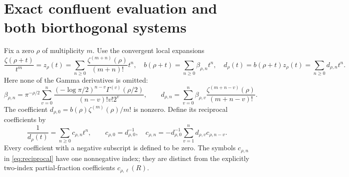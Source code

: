 \documentclass[11pt]{article}
\begin{document}
\section{Exact confluent evaluation and both biorthogonal systems}

Fix a zero $\rho$ of multiplicity $m$. Use the convergent local
expansions
\begin{equation}\label{eq:local}
 \frac{\zeta(\rho+t)}{t^m}=z_\rho(t)
  =\sum_{n\geq0}\frac{\zeta^{(m+n)}(\rho)}{(m+n)!}t^n,
 \quad b(\rho+t)=\sum_{n\geq0}\beta_{\rho,n}t^n,
 \quad d_\rho(t)=b(\rho+t)z_\rho(t)=\sum_{n\geq0}d_{\rho,n}t^n.
\end{equation}
Here none of the Gamma derivatives is omitted:
\begin{equation}\label{eq:gamma-coeff}
 \beta_{\rho,n}=\pi^{-\rho/2}
 \sum_{v=0}^n
 \frac{(-\log\pi/2)^{n-v}\Gamma^{(v)}(\rho/2)}
                   {(n-v)!v!2^v},\qquad
 d_{\rho,n}=\sum_{v=0}^n\beta_{\rho,v}
                  \frac{\zeta^{(m+n-v)}(\rho)}{(m+n-v)!}.
\end{equation}
The coefficient $d_{\rho,0}=b(\rho)\zeta^{(m)}(\rho)/m!$
is nonzero. Define its reciprocal coefficients by
\begin{equation}\label{eq:reciprocal}
 \frac1{d_\rho(t)}=\sum_{n\geq0}c_{\rho,n}t^n,\qquad
 c_{\rho,0}=d_{\rho,0}^{-1},\quad
 c_{\rho,n}=-d_{\rho,0}^{-1}
                    \sum_{v=1}^nd_{\rho,v}c_{\rho,n-v}.
\end{equation}
Every coefficient with a negative subscript is defined to be zero.
The symbols $c_{\rho,n}$ in \eqref{eq:reciprocal} have one
nonnegative index; they are distinct from the explicitly
two-index partial-fraction coefficients $c_{\rho,\ell}(R)$.
\end{document}
